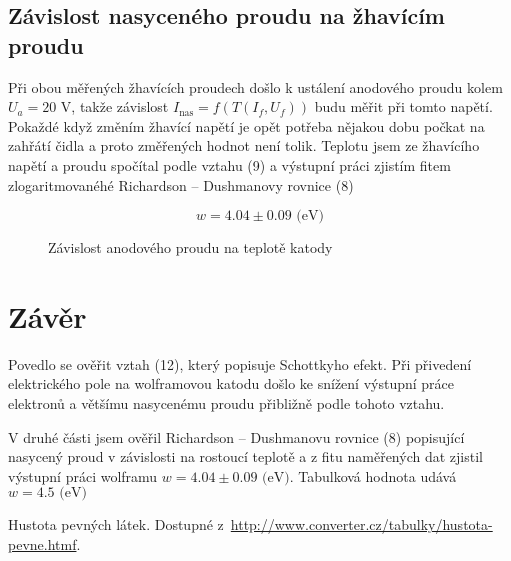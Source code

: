 \documentclass[a4paper,11pt]{article}
\begin{document}
\subsection{Závislost nasyceného proudu na žhavícím proudu}

Při obou měřených žhavících proudech došlo k ustálení anodového proudu kolem $ U_a = 20 $ V, takže závislost $ I_{\text{nas}} = f(T(I_f, U_f)) $ budu měřit při tomto napětí. Pokaždé když změním žhavící napětí je opět potřeba nějakou dobu počkat na zahřátí čidla a proto změřených hodnot není tolik. Teplotu jsem ze žhavícího napětí a proudu spočítal podle vztahu (9) a výstupní práci zjistím fitem zlogaritmovanéhé Richardson – Dushmanovy rovnice (8)

\begin{equation*}
w = 4.04 \pm 0.09 \text{ (eV)}
\end{equation*}

\begin{figure}[h]
    \centering
    
    \caption{Závislost anodového proudu na teplotě katody }
\end{figure}

\section{Závěr}

Povedlo se ověřit vztah (12), který popisuje Schottkyho efekt. Při přivedení elektrického pole na wolframovou katodu došlo ke snížení výstupní práce elektronů a většímu nasycenému proudu přibližně podle tohoto vztahu. 

V druhé části jsem ověřil Richardson – Dushmanovu rovnice (8) popisující nasycený proud v závislosti na rostoucí teplotě a z fitu naměřených dat zjistil výstupní práci wolframu $ w = 4.04 \pm 0.09 \text{ (eV)} $. Tabulková hodnota udává $ w = 4.5  \text{ (eV)} $


\begin{thebibliography}{0}
 Hustota pevných látek. Dostupné z~\url{http://www.converter.cz/tabulky/hustota-pevne.htmf}.   
\end{thebibliography}
\end{document}
